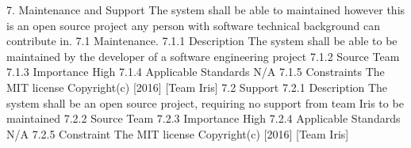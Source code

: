 

7. Maintenance and Support
The system shall be able to maintained however this is an open source project any person with software technical background can contribute in. 
	7.1 Maintenance.
		7.1.1 Description
      The system shall be able to be maintained by the developer of a software engineering project
    7.1.2 Source
      Team
    7.1.3 Importance
      High
    7.1.4 Applicable Standards
      N/A
    7.1.5 Constraints
      The MIT license
      Copyright(c) [2016] [Team Iris]   
	7.2 Support
		7.2.1 Description
      The system shall be an open source project, requiring no support from team Iris to be maintained
    7.2.2 Source
		  Team
    7.2.3 Importance
      High
    7.2.4 Applicable Standards
      N/A
    7.2.5 Constraint
      The MIT license
      Copyright(c) [2016] [Team Iris]
